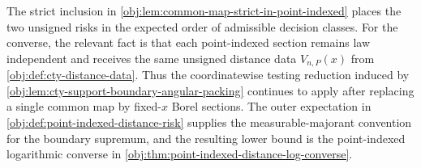 The strict inclusion in \cref{obj:lem:common-map-strict-in-point-indexed} places the two unsigned risks in the expected order of admissible decision classes. For the converse, the relevant fact is that each point-indexed section remains law independent and receives the same unsigned distance data \(V_{n,P}(x)\) from \cref{obj:def:cty-distance-data}. Thus the coordinatewise testing reduction induced by \cref{obj:lem:cty-support-boundary-angular-packing} continues to apply after replacing a single common map by fixed-\(x\) Borel sections. The outer expectation in \cref{obj:def:point-indexed-distance-risk} supplies the measurable-majorant convention for the boundary supremum, and the resulting lower bound is the point-indexed logarithmic converse in \cref{obj:thm:point-indexed-distance-log-converse}.
